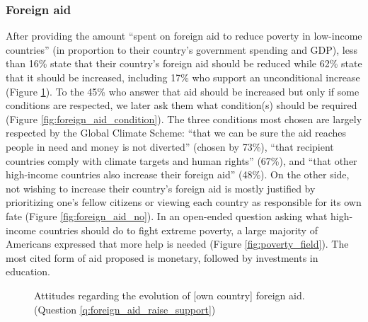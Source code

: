 \subsubsection{Foreign aid} %
After providing the amount %
``spent on foreign aid to reduce poverty in low-income countries'' (in proportion to their country's government spending and GDP), less than 16\% state that their country's foreign aid should be reduced while 62\% state that it should be increased, including 17\% who support an unconditional increase (Figure \ref{fig:foreign_aid_raise_support}). To the 45\% who answer that aid should be increased but only if some conditions are respected, we later ask them what condition(s) should be required (Figure \ref{fig:foreign_aid_condition}). The three conditions most chosen are largely respected by the Global Climate Scheme: %
``that we can be sure the aid reaches people in need and money is not diverted'' (chosen by 73\%), ``that recipient countries comply with climate targets and human rights'' (67\%), and ``that other high-income countries also increase their foreign aid'' (48\%). %
On the other side, not wishing to increase their country's foreign aid is mostly justified by prioritizing one's fellow citizens or viewing each country as responsible for its own fate (Figure \ref{fig:foreign_aid_no}). In an open-ended question asking what high-income countries should do to fight extreme poverty, a large majority of Americans expressed that more help is needed (Figure \ref{fig:poverty_field}). The most cited form of aid proposed is monetary, followed by investments in education.

\begin{figure}[h!]
  \caption[Attitudes on the evolution of foreign aid]{Attitudes regarding the evolution of [own country] foreign aid. (Question \ref{q:foreign_aid_raise_support})}\label{fig:foreign_aid_raise_support}
\end{figure}

